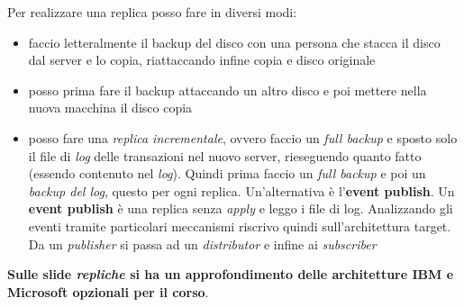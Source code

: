 \documentclass[a4paper,12pt, oneside]{book}
\begin{document}
Per realizzare una replica posso fare in diversi modi:
\begin{itemize}
  \item faccio letteralmente il backup del disco con una persona che stacca il
  disco dal server e lo copia, riattaccando infine copia e disco originale
  \item posso prima fare il backup attaccando un altro disco e poi mettere nella
  nuova macchina il disco copia
  \item posso fare una \textit{replica incrementale}, ovvero faccio un
  \textit{full backup} e sposto solo il file di \textit{log} delle transazioni
  nel nuovo server, rieseguendo quanto fatto (essendo contenuto nel
  \textit{log}). Quindi prima faccio un \textit{full
    backup} e poi un \textit{backup \textnormal{del} log}, questo per ogni
  replica. Un'alternativa è l'\textbf{event publish}.
  Un \textbf{event publish} è una replica senza \textit{apply} e
  leggo i file di log. Analizzando gli eventi tramite particolari meccanismi
  riscrivo quindi sull'architettura target. Da un \textit{publisher} si passa ad
  un \textit{distributor} e infine ai \textit{subscriber}
\end{itemize}
\textbf{Sulle slide \textit{repliche} si ha un approfondimento delle
  architetture IBM e Microsoft opzionali per il corso}.
\end{document}
